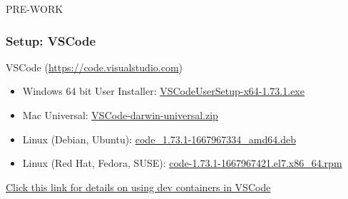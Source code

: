 \documentclass[aspectratio=169]{beamer}
\begin{document}
\begin{frame}
	\Huge \textcolor{dgreen}{PRE-WORK}
\end{frame}
                                                                          

\begin{frame}
	\frametitle{Setup: VSCode}
	VSCode (\href{https://code.visualstudio.com}{https://code.visualstudio.com})
	\begin{itemize}
		\item Windows 64 bit User Installer: \href{https://prereqs.codemash.org/Files/VVSCodeUserSetup-x64-1.73.1.exe}{VSCodeUserSetup-x64-1.73.1.exe}
		\item Mac Universal: \href{https://prereqs.codemash.org/Files/VSCode-darwin-universal.zip}{VSCode-darwin-universal.zip}
		\item Linux (Debian, Ubuntu): \href{https://prereqs.codemash.org/Files/code_1.73.1-1667967334_amd64.deb}{code\_1.73.1-1667967334\_amd64.deb}
		\item  Linux (Red Hat, Fedora, SUSE): \href{https://prereqs.codemash.org/Files/code-1.73.1-1667967421.el7.x86_64.rpm}{code-1.73.1-1667967421.el7.x86\_64.rpm}
	\end{itemize}
	\vspace{2mm}
	\href{https://code.visualstudio.com/docs/devcontainers/containers}{Click this link for details on using dev containers in VSCode}
\end{frame}
\end{document}
